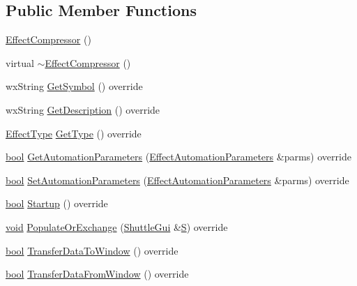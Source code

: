 \subsection*{Public Member Functions}
\begin{DoxyCompactItemize}
\item 
\hyperlink{class_effect_compressor_aade50624fcb5cbfc56eca96b8b7f297b}{Effect\+Compressor} ()
\item 
virtual \hyperlink{class_effect_compressor_ad7cc1d124e9f8290c4c992b6d670ab6b}{$\sim$\+Effect\+Compressor} ()
\item 
wx\+String \hyperlink{class_effect_compressor_a37554bae99e22fb4748effb26b546322}{Get\+Symbol} () override
\item 
wx\+String \hyperlink{class_effect_compressor_aa110cd01cf0f612bb3d0fda66f8aa014}{Get\+Description} () override
\item 
\hyperlink{_effect_interface_8h_a4809a7bb3fd1a421902a667cc1405d43}{Effect\+Type} \hyperlink{class_effect_compressor_ac603edd915b70d7c345657ec1a8adb1d}{Get\+Type} () override
\item 
\hyperlink{mac_2config_2i386_2lib-src_2libsoxr_2soxr-config_8h_abb452686968e48b67397da5f97445f5b}{bool} \hyperlink{class_effect_compressor_a14ca9113f746d37aaa6f0ac9389cf338}{Get\+Automation\+Parameters} (\hyperlink{class_effect_automation_parameters}{Effect\+Automation\+Parameters} \&parms) override
\item 
\hyperlink{mac_2config_2i386_2lib-src_2libsoxr_2soxr-config_8h_abb452686968e48b67397da5f97445f5b}{bool} \hyperlink{class_effect_compressor_ad75f612fcc49fdcf12565c1336b5d990}{Set\+Automation\+Parameters} (\hyperlink{class_effect_automation_parameters}{Effect\+Automation\+Parameters} \&parms) override
\item 
\hyperlink{mac_2config_2i386_2lib-src_2libsoxr_2soxr-config_8h_abb452686968e48b67397da5f97445f5b}{bool} \hyperlink{class_effect_compressor_ad867698970cd08b682574eda7cd49671}{Startup} () override
\item 
\hyperlink{sound_8c_ae35f5844602719cf66324f4de2a658b3}{void} \hyperlink{class_effect_compressor_adf85806b6de1fd7b2ec978a6fefd6eed}{Populate\+Or\+Exchange} (\hyperlink{class_shuttle_gui}{Shuttle\+Gui} \&\hyperlink{xlftab_8c_af933676109efed7ab34cea71d748a517}{S}) override
\item 
\hyperlink{mac_2config_2i386_2lib-src_2libsoxr_2soxr-config_8h_abb452686968e48b67397da5f97445f5b}{bool} \hyperlink{class_effect_compressor_a3b21c1c853474bb9d4950f245010fea2}{Transfer\+Data\+To\+Window} () override
\item 
\hyperlink{mac_2config_2i386_2lib-src_2libsoxr_2soxr-config_8h_abb452686968e48b67397da5f97445f5b}{bool} \hyperlink{class_effect_compressor_aaca3bbab824b9b8d35744d6369418a54}{Transfer\+Data\+From\+Window} () override
\end{DoxyCompactItemize}
